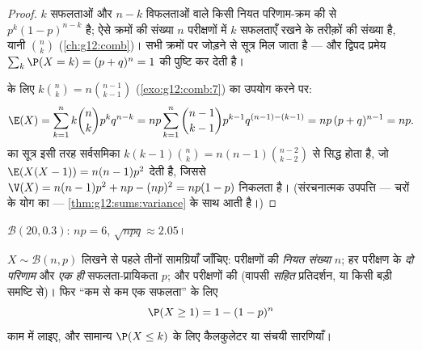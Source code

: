 \begin{proof}
$k$ सफलताओं और $n-k$ विफलताओं वाले किसी नियत परिणाम-क्रम की 
 से $p^k(1-p)^{n-k}$ है; ऐसे क्रमों की संख्या $n$ परीक्षणों में $k$ सफलताएँ
रखने के तरीक़ों की संख्या है, यानी $\binom nk$ (\cref{ch:g12:comb})। सभी क्रमों पर जोड़ने से सूत्र
मिल जाता है --- और द्विपद प्रमेय $\sum_k \P(X = k) = (p + q)^n = 1$ की पुष्टि कर देती है।

 के लिए $k\binom nk = n\binom{n-1}{k-1}$ (\cref{exo:g12:comb:7}) का उपयोग करने पर:
\[
\E(X) = \sum_{k=1}^{n} k\binom nk p^k q^{n-k}
= np\sum_{k=1}^{n} \binom{n-1}{k-1} p^{k-1} q^{(n-1)-(k-1)}
= np\,(p + q)^{n-1} = np .
\]
 का सूत्र इसी तरह सर्वसमिका $k(k-1)\binom nk = n(n-1)\binom{n-2}{k-2}$ से सिद्ध होता है, जो $\E(X(X-1)) = n(n-1)p^2$ देती है,
जिससे $\V(X) = n(n-1)p^2 + np - (np)^2 = np(1-p)$ निकलता है। (संरचनात्मक उपपत्ति ---  चरों के योग का 
--- \cref{thm:g12:sums:variance} के साथ आती है।)
\end{proof}

\begin{omfigure}

{\small {} $\mathcal B(20, 0.3)$:  $np = 6$,  $\sqrt{npq} \approx 2.05$।}
\end{omfigure}

\begin{method}[द्विपद स्थिति पहचानना]\label{met:g12:randvar:recognize}
$X \sim \mathcal B(n,p)$ लिखने से पहले तीनों सामग्रियाँ जाँचिए: परीक्षणों की \emph{नियत संख्या}
$n$; हर परीक्षण के \emph{दो परिणाम} और \emph{एक ही} सफलता-प्रायिकता $p$;
और परीक्षणों की \emph{} (वापसी \emph{सहित} प्रतिदर्शन, या किसी बड़ी
समष्टि से)। फिर ``कम से कम एक सफलता'' के लिए
\[
\P(X \geq 1) = 1 - (1-p)^n
\]
काम में लाइए, और सामान्य $\P(X \leq k)$ के लिए कैलकुलेटर या संचयी सारणियाँ।
\end{method}

